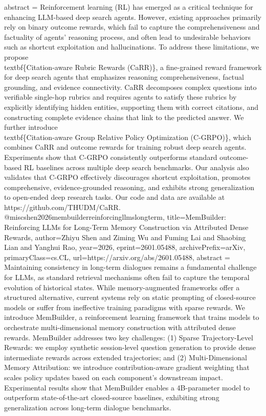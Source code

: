 {      abstract = {Reinforcement learning (RL) has emerged as a critical technique for enhancing LLM-based deep search agents. However, existing approaches primarily rely on binary outcome rewards, which fail to capture the comprehensiveness and factuality of agents' reasoning process, and often lead to undesirable behaviors such as shortcut exploitation and hallucinations. To address these limitations, we propose \\textbf\{Citation-aware Rubric Rewards (CaRR)\}, a fine-grained reward framework for deep search agents that emphasizes reasoning comprehensiveness, factual grounding, and evidence connectivity. CaRR decomposes complex questions into verifiable single-hop rubrics and requires agents to satisfy these rubrics by explicitly identifying hidden entities, supporting them with correct citations, and constructing complete evidence chains that link to the predicted answer. We further introduce \\textbf\{Citation-aware Group Relative Policy Optimization (C-GRPO)\}, which combines CaRR and outcome rewards for training robust deep search agents. Experiments show that C-GRPO consistently outperforms standard outcome-based RL baselines across multiple deep search benchmarks. Our analysis also validates that C-GRPO effectively discourages shortcut exploitation, promotes comprehensive, evidence-grounded reasoning, and exhibits strong generalization to open-ended deep research tasks. Our code and data are available at https://github.com/THUDM/CaRR.}
}@misc{shen2026membuilderreinforcingllmslongterm,
      title={MemBuilder: Reinforcing LLMs for Long-Term Memory Construction via Attributed Dense Rewards}, 
      author={Zhiyu Shen and Ziming Wu and Fuming Lai and Shaobing Lian and Yanghui Rao},
      year={2026},
      eprint={2601.05488},
      archivePrefix={arXiv},
      primaryClass={cs.CL},
      url={https://arxiv.org/abs/2601.05488},
      abstract = {Maintaining consistency in long-term dialogues remains a fundamental challenge for LLMs, as standard retrieval mechanisms often fail to capture the temporal evolution of historical states. While memory-augmented frameworks offer a structured alternative, current systems rely on static prompting of closed-source models or suffer from ineffective training paradigms with sparse rewards. We introduce MemBuilder, a reinforcement learning framework that trains models to orchestrate multi-dimensional memory construction with attributed dense rewards. MemBuilder addresses two key challenges: (1) Sparse Trajectory-Level Rewards: we employ synthetic session-level question generation to provide dense intermediate rewards across extended trajectories; and (2) Multi-Dimensional Memory Attribution: we introduce contribution-aware gradient weighting that scales policy updates based on each component's downstream impact. Experimental results show that MemBuilder enables a 4B-parameter model to outperform state-of-the-art closed-source baselines, exhibiting strong generalization across long-term dialogue benchmarks.}
}
